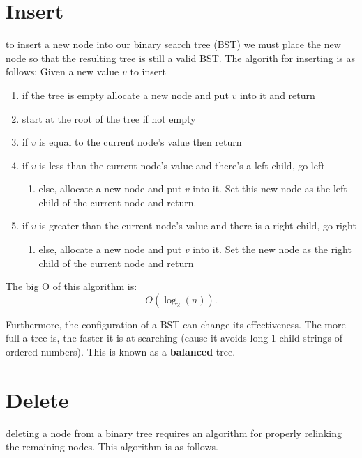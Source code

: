 \documentclass[12pt]{book}
\title{\coursetitle\linebreak\lecturename}
\author{\\Cain Susko\\ 
           \\ \\ \\
      Queen's University 
    \\School of Computing\\}
\begin{document}
\begin{titlepage}
        \maketitle
\end{titlepage}


\section*{Insert}
to insert a new node into our binary search tree (BST) we must place the new node so that the resulting tree is still a valid BST.
The algorith for inserting is as follows:
Given a new value $v$ to insert
\begin{enumerate}
        \item if the tree is empty allocate a new node and put $v$ into it and return
        \item start at the root of the tree if not empty
        \item if  $v$ is equal to the current node's value then return
        \item if $v$ is less than the current node's value and there's a left child, go left
        \begin{enumerate}
                \item else, allocate a new node and put  $v$ into it. 
                Set this new node as the left child of the current node and return.
        \end{enumerate}
        \item if $v$ is greater than the current node's value and there is a right child, go right
        \begin{enumerate}
                \item else, allocate a new node and put $v$ into it. 
                        Set the new node as the right child of the current node and return
        \end{enumerate}
\end{enumerate}

The big O of this algorithm is:
\[
O\left( \log_2 (n) \right) 
.\] 

Furthermore, the configuration of a BST can change its effectiveness. 
The more full a tree is, the faster it is at searching (cause it avoids long 1-child strings of ordered numbers).
This is known as a \textbf{balanced} tree.
\pagebreak


\section*{Delete}
deleting a node from a binary tree requires an algorithm for properly relinking the remaining nodes.
This algorithm is as follows.
\end{document}

